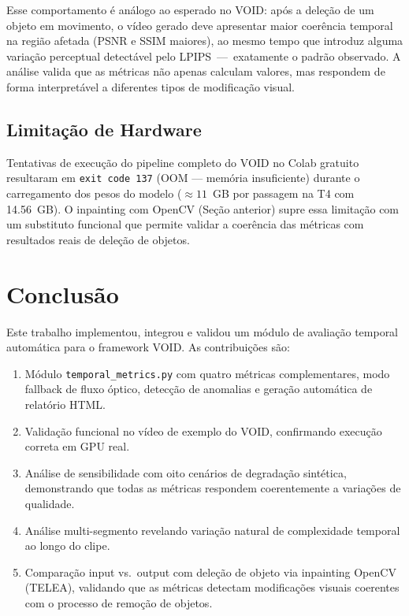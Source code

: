 \documentclass[conference]{IEEEtran}
\begin{document}
Esse comportamento é análogo ao esperado no VOID: após a deleção de um objeto em movimento, o vídeo gerado deve apresentar maior coerência temporal na região afetada (PSNR e SSIM maiores), ao mesmo tempo que introduz alguma variação perceptual detectável pelo LPIPS~---~exatamente o padrão observado. A análise valida que as métricas não apenas calculam valores, mas respondem de forma interpretável a diferentes tipos de modificação visual.

\subsection{Limitação de Hardware}

Tentativas de execução do pipeline completo do VOID no Colab gratuito resultaram em \texttt{exit code 137} (OOM — memória insuficiente) durante o carregamento dos pesos do modelo ($\approx 11$~GB por passagem na T4 com 14.56~GB). O inpainting com OpenCV (Seção anterior) supre essa limitação com um substituto funcional que permite validar a coerência das métricas com resultados reais de deleção de objetos.

\section{Conclusão}

Este trabalho implementou, integrou e validou um módulo de avaliação temporal automática para o framework VOID. As contribuições são:

\begin{enumerate}
    \item Módulo \texttt{temporal\_metrics.py} com quatro métricas complementares, modo fallback de fluxo óptico, detecção de anomalias e geração automática de relatório HTML.
    \item Validação funcional no vídeo de exemplo do VOID, confirmando execução correta em GPU real.
    \item Análise de sensibilidade com oito cenários de degradação sintética, demonstrando que todas as métricas respondem coerentemente a variações de qualidade.
    \item Análise multi-segmento revelando variação natural de complexidade temporal ao longo do clipe.
    \item Comparação input vs.\ output com deleção de objeto via inpainting OpenCV (TELEA), validando que as métricas detectam modificações visuais coerentes com o processo de remoção de objetos.
\end{enumerate}
\end{document}
